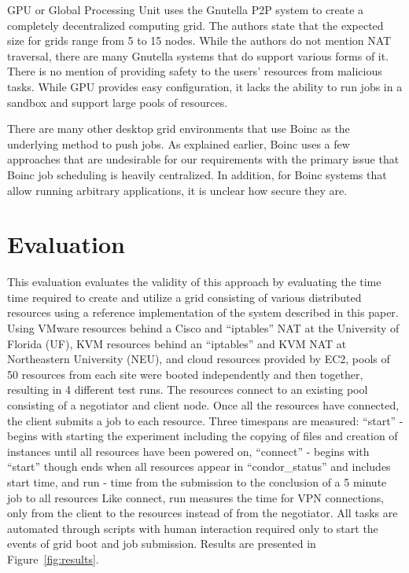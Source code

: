 \documentclass{sig-alternate}
\begin{document}
GPU or Global Processing Unit uses the Gnutella P2P system to create a
completely decentralized computing grid.  The authors state that the expected
size for grids range from 5 to 15 nodes.  While the authors do not mention NAT
traversal, there are many Gnutella systems that do support various forms of it.
There is no mention of providing safety to the users' resources from malicious
tasks.  While GPU provides easy configuration, it lacks the ability to run
jobs in a sandbox and support large pools of resources.

There are many other desktop grid environments that use Boinc as the underlying
method to push jobs.  As explained earlier, Boinc uses a few approaches that
are undesirable for our requirements with the primary issue that Boinc job
scheduling is heavily centralized.  In addition, for Boinc systems that allow
running arbitrary applications, it is unclear how secure they are.

\section{Evaluation}
\label{evaluation}
This evaluation evaluates the validity of this approach by evaluating the time
time required to create and utilize a grid consisting of various distributed
resources using a reference implementation of the system described in this
paper.  Using VMware resources behind a Cisco and ``iptables'' NAT at the
University of Florida (UF), KVM resources behind an ``iptables'' and KVM NAT at
Northeastern University (NEU), and cloud resources provided by EC2, pools of 50
resources from each site were booted independently and then together, resulting
in 4 different test runs.  The resources connect to an existing pool consisting
of a negotiator and client node.  Once all the resources have connected, the
client submits a job to each resource.  Three timespans are measured: ``start''
- begins with starting the experiment including the copying of files and
creation of instances until all resources have been powered on, ``connect'' -
begins with ``start'' though ends when all resources appear in
``condor\_status'' and includes start time, and run - time from the submission
to the conclusion of a 5 minute job to all resources Like connect, run measures
the time for VPN connections, only from the client to the resources instead of
from the negotiator.  All tasks are automated through scripts with human
interaction required only to start the events of grid boot and job submission.
Results are presented in Figure~\ref{fig:results}.
\end{document}
